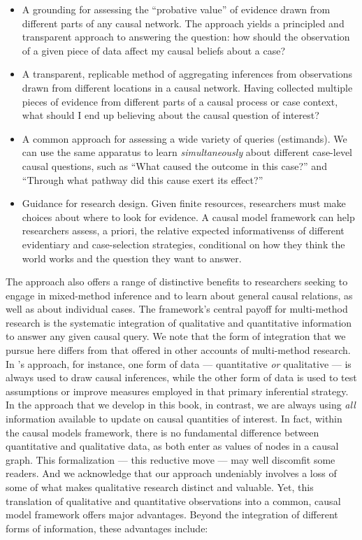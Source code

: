 \documentclass[
  12pt,
]{book}
\providecommand{\tightlist}{%
  \setlength{\itemsep}{0pt}\setlength{\parskip}{0pt}}
\begin{document}
\begin{itemize}
\item
  A grounding for assessing the ``probative value'' of evidence drawn from different parts of any causal network. The approach yields a principled and transparent approach to answering the question: how should the observation of a given piece of data affect my causal beliefs about a case?
\item
  A transparent, replicable method of aggregating inferences from observations drawn from different locations in a causal network. Having collected multiple pieces of evidence from different parts of a causal process or case context, what should I end up believing about the causal question of interest?
\item
  A common approach for assessing a wide variety of queries (estimands). We can use the same apparatus to learn \emph{simultaneously} about different case-level causal questions, such as ``What caused the outcome in this case?'' and ``Through what pathway did this cause exert its effect?''
\end{itemize}

\begin{itemize}
\tightlist
\item
  Guidance for research design. Given finite resources, researchers must make choices about where to look for evidence. A causal model framework can help researchers assess, a priori, the relative expected informativenss of different evidentiary and case-selection strategies, conditional on how they think the world works and the question they want to answer.
\end{itemize}

The approach also offers a range of distinctive benefits to researchers seeking to engage in mixed-method inference and to learn about general causal relations, as well as about individual cases. The framework's central payoff for multi-method research is the systematic integration of qualitative and quantitative information to answer any given causal query. We note that the form of integration that we pursue here differs from that offered in other accounts of multi-method research. In \citet{seawrightbook}'s approach, for instance, one form of data --- quantitative \emph{or} qualitative --- is always used to draw causal inferences, while the other form of data is used to test assumptions or improve measures employed in that primary inferential strategy. In the approach that we develop in this book, in contrast, we are always using \emph{all} information available to update on causal quantities of interest. In fact, within the causal models framework, there is no fundamental difference between quantitative and qualitative data, as both enter as values of nodes in a causal graph. This formalization --- this reductive move --- may well discomfit some readers. And we acknowledge that our approach undeniably involves a loss of some of what makes qualitative research distinct and valuable. Yet, this translation of qualitative and quantitative observations into a common, causal model framework offers major advantages. Beyond the integration of different forms of information, these advantages include:
\end{document}
